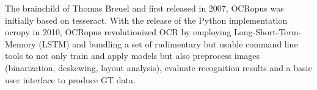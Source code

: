 \documentclass[conference]{IEEEtran}
\begin{document}
The brainchild of Thomas Breuel and first released in 2007, OCRopus \cite{breuel} was initially based on tesseract. With the release of the Python implementation ocropy in 2010, OCRopus revolutionized OCR by employing Long-Short-Term-Memory (LSTM) and bundling a set of rudimentary but usable command
line tools to not only train and apply models but also preprocess images (binarization, deskewing, layout analysis), evaluate recognition results and a basic user interface to produce GT data.
\end{document}
